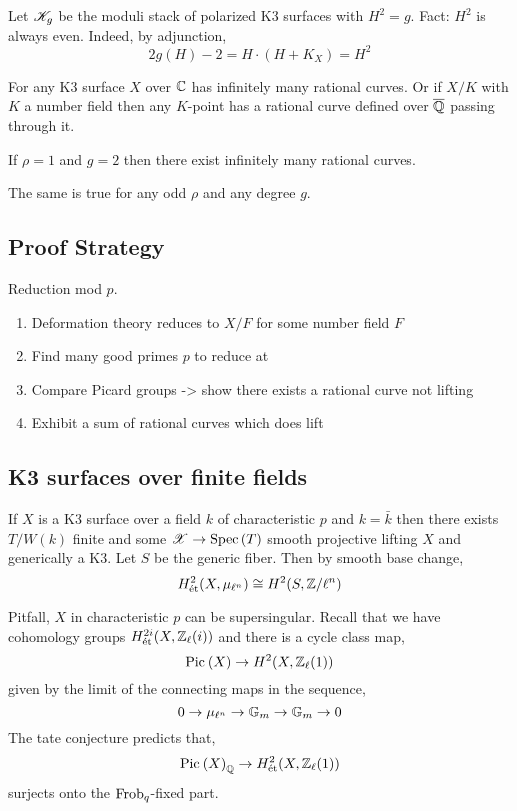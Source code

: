 \documentclass[12pt]{article}
\begin{document}
Let $\mathscr{K}_g$ be the moduli stack of polarized K3 surfaces with $H^2 = g$. Fact: $H^2$ is always even. Indeed, by adjunction,
\[ 2 g(H) - 2 = H \cdot (H + K_X) = H^2 \]

\begin{conj}[Bogomolov]
For any K3 surface $X$ over $\mathbb{C}$ has infinitely many rational curves. Or if $X / K$ with $K$ a number field then any $K$-point has a rational curve defined over $\overline{\mathbb{Q}}$ passing through it.
\end{conj}

\begin{theorem}
If $\rho = 1$ and $g = 2$ then there exist infinitely many rational curves. 
\end{theorem}

\begin{theorem}[Li-Liedtke]
The same is true for any odd $\rho$ and any degree $g$.
\end{theorem}

\subsection{Proof Strategy}

Reduction mod $p$.

\begin{enumerate}
\item Deformation theory reduces to $X/F$ for some number field $F$
\item Find many good primes $p$ to reduce at
\item Compare Picard groups -> show there exists a rational curve not lifting
\item Exhibit a sum of rational curves which does lift 
\end{enumerate}

\subsection{K3 surfaces over finite fields}

\begin{theorem}
If $X$ is a K3 surface over a field $k$ of characteristic $p$ and $k = \bar{k}$ then there exists $T / W(k)$ finite and some $\mathscr{X} \to \mathrm{Spec}\left( T \right)$ smooth projective lifting $X$ and generically a K3. Let $S$ be the generic fiber. Then by smooth base change,
\[ H^2_{\text{\'{e}t}}(X, \mu_{\ell^n}) \cong H^2(S, \mathbb{Z} / \ell^n) \]
\end{theorem}

Pitfall, $X$ in characteristic $p$ can be supersingular. Recall that we have \etale cohomology groups $H^{2i}_{\text{\'{e}t}}(X, \mathbb{Z}_\ell(i))$ and there is a cycle class map,
\[ \mathrm{Pic}^{} \left( X \right) \to H^2(X, \mathbb{Z}_\ell(1)) \]
given by the limit of the connecting maps in the sequence,
\[ 0 \to \mu_{\ell^n} \to \mathbb{G}_m \to \mathbb{G}_m \to 0 \]
The tate conjecture predicts that,
\[ \mathrm{Pic}^{} \left( X \right)_{\mathbb{Q}} \to H^2_{\text{\'{e}t}}(X, \mathbb{Z}_\ell(1)) \]
surjects onto the $\operatorname{\mathrm{Frob}}_q$-fixed part. 
\end{document}

